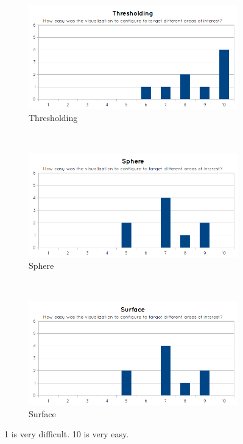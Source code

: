 \begin{figure}[H]
  \centering
  \begin{subfigure}[b]{0.5\textwidth}
    \includegraphics[width=\textwidth]{images/evaluation/graph_thresholding_3.png}
    \caption*{Thresholding}
    \label{fig:eval_visualization_q3_thresholding}
  \end{subfigure}%
  ~ %
  \begin{subfigure}[b]{0.5\textwidth}
    \includegraphics[width=\textwidth]{images/evaluation/graph_sphere_3.png}
    \caption*{Sphere}
    \label{fig:eval_visualization_q3_sphere}
  \end{subfigure}
  ~ %
  \begin{subfigure}[b]{0.5\textwidth}
    \includegraphics[width=\textwidth]{images/evaluation/graph_surface_3.png}
    \caption*{Surface}
    \label{fig:eval_visualization_q3_surface}  
  \end{subfigure}
  \caption{1 is very difficult. 10 is very easy.}\label{fig:eval_visualization_q3}
\end{figure}

